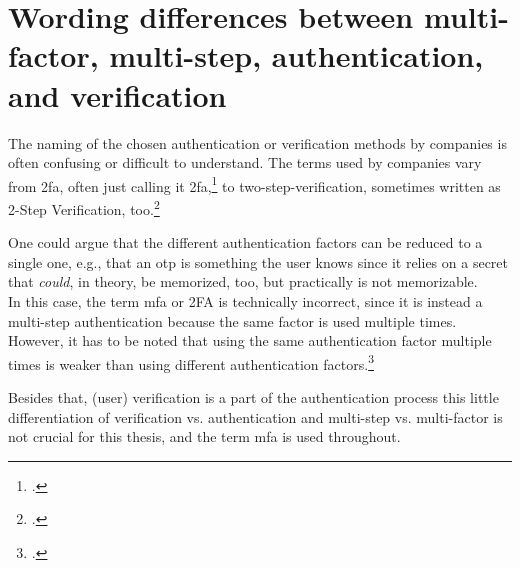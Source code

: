 \section{Wording differences between multi-factor, multi-step, authentication, and verification}

The naming of the chosen authentication or verification methods by companies is often confusing or difficult to understand. The terms used by companies vary from \gls{2fa}, often just calling it \gls{2fa},\footcite{apple_2fa} to two-step-verification, sometimes written as 2-Step Verification, too.\footcites[][]{apple_s2v}[][]{playstation}[][]{google_2-step_verification}[][]{microsoft_2sv}

One could argue that the different authentication factors can be reduced to a single one, e.g., that an \gls{otp} is \frqq something the user knows\flqq{} since it relies on a secret that \textit{could}, in theory, be memorized, too, but practically is not memorizable.\\
In this case, the term \gls{mfa} or 2FA is technically incorrect, since it is instead a multi-step authentication because the same factor is used multiple times. However, it has to be noted that using the same authentication factor multiple times is weaker than using different authentication factors.\footcite[See][117]{grimes2017hacking}

Besides that, (user) verification is a part of the authentication process this little differentiation of verification vs. authentication and multi-step vs. multi-factor is not crucial for this thesis, and the term \gls{mfa} is used throughout.

%
%
%
%
%
%
%
